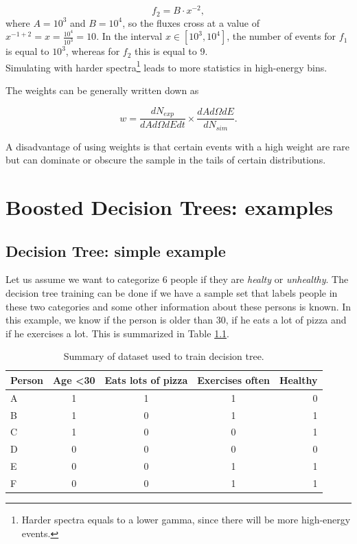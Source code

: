 \begin{appendices}
\begin{itemize}
\begin{equation}
f_2 = B \cdot x^{-2},
\end{equation}
\noindent where $A = 10^3$ and $B = 10^4$, so the fluxes cross at a value of $x^{-1+2} = x = \frac{10^4}{10^3} = 10$. In the interval $x \in [10^3,10^4]$, the number of events for $f_1$ is equal to $10^3$, whereas for $f_2$ this is equal to 9.\\

\noindent Simulating with harder spectra\footnote{Harder spectra equals to a lower gamma, since there will be more high-energy events.} leads to more statistics in high-energy bins.
\end{itemize}
\vspace{3mm}
\noindent The weights can be generally written down as

\begin{equation}
w = \frac{dN_{exp}}{dA d\Omega dE dt} \times \frac{dA d\Omega dE}{dN_{sim}}.
\end{equation}

\vspace{3mm}
\noindent A disadvantage of using weights is that certain events with a high weight are rare but can dominate or obscure the sample in the tails of certain distributions.

\chapter{Boosted Decision Trees: examples}
\label{ch:adaboostappendix}

\section{Decision Tree: simple example}
Let us assume we want to categorize 6 people if they are \textit{healty} or \textit{unhealthy}. The decision tree training can be done if we have a sample set that labels people in these two categories and some other information about these persons is known. In this example, we know if the person is older than 30, if he eats a lot of pizza and if he exercises a lot. This is summarized in Table \ref{tab:pizza}.\\

\begin{table}[t]
\centering
\caption{Summary of dataset used to train decision tree.}
\label{tab:pizza}
\begin{tabular}{|l|c|c|c|r|}
\hline
\rowcolor[HTML]{F1A91E} 
Person & Age \textless 30 & Eats lots of pizza & Exercises often & Healthy \\ \hline
A & 1 & 1 & 1 & 0 \\ \hline
B & 1 & 0 & 1 & 1 \\ \hline
C & 1 & 0 & 0 & 1 \\ \hline
D & 0 & 0 & 0 & 0 \\ \hline
E & 0 & 0 & 1 & 1 \\ \hline
F & 0 & 0 & 1 & 1 \\ \hline
\end{tabular}
\end{table}


\end{appendices}
